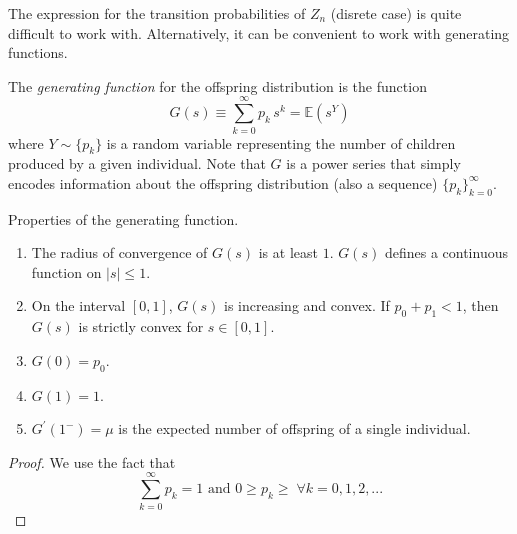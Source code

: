     The expression for the transition probabilities of $Z_n$ (disrete case) is quite difficult to work with. Alternatively, it can be convenient to work with generating functions. 

    \begin{definition}
      The \textit{generating function} for the offspring distribution is the function 
      \begin{equation}
        G(s) \equiv \sum_{k=0}^\infty p_k \, s^k = \mathbb{E}(s^Y)
      \end{equation}
      where $Y \sim \{p_k\}$ is a random variable representing the number of children produced by a given individual. Note that $G$ is a power series that simply encodes information about the offspring distribution (also a sequence) $\{p_k\}_{k=0}^\infty$. 
    \end{definition}

    \begin{theorem}[Properties]
      Properties of the generating function. 
      \begin{enumerate}
        \item The radius of convergence of $G(s)$ is at least $1$. $G(s)$ defines a continuous function on $|s| \leq 1$. 
        \item On the interval $[0,1]$, $G(s)$ is increasing and convex. If $p_0 + p_1 < 1$, then $G(s)$ is strictly convex for $s \in [0,1]$. 
        \item $G(0) = p_0$. 
        \item $G(1) = 1$. 
        \item $G^\prime(1^-) = \mu$ is the expected number of offspring of a single individual. 
      \end{enumerate}
    \end{theorem}
    \begin{proof}
      We use the fact that 
      \[\sum_{k=0}^\infty p_k = 1 \text{ and } 0 \geq p_k \geq \; \forall k = 0, 1, 2, ...\]
    \end{proof}

